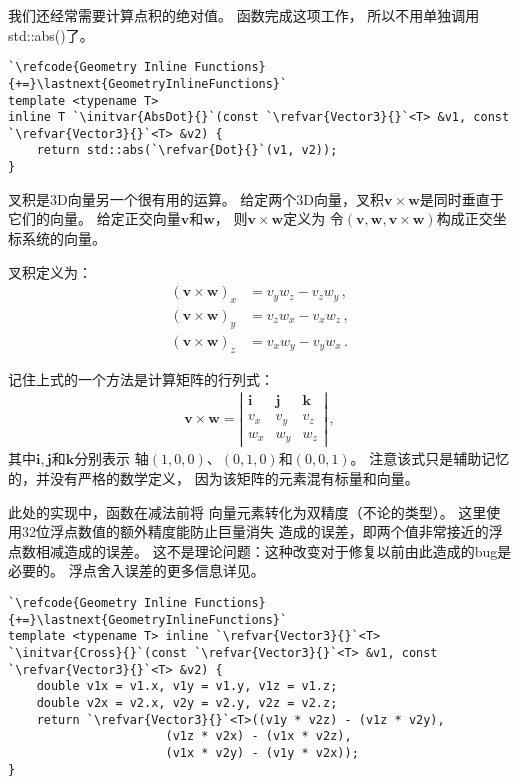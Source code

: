 我们还经常需要计算点积的绝对值。
函数完成这项工作，
所以不用单独调用{\ttfamily std::abs()}了。
\begin{lstlisting}
`\refcode{Geometry Inline Functions}{+=}\lastnext{GeometryInlineFunctions}`
template <typename T>
inline T `\initvar{AbsDot}{}`(const `\refvar{Vector3}{}`<T> &v1, const `\refvar{Vector3}{}`<T> &v2) {
    return std::abs(`\refvar{Dot}{}`(v1, v2));
}
\end{lstlisting}

叉积是3D向量另一个很有用的运算。
给定两个3D向量，叉积$\bm v\times\bm w$是同时垂直于它们的向量。
给定正交向量$\bm v$和$\bm w$，
则$\bm v\times\bm w$定义为
令$(\bm v,\bm w,\bm v\times\bm w)$构成正交坐标系统的向量。

叉积定义为：
\begin{align*}
    (\bm v\times\bm w)_x & = v_y w_z- v_z w_y\, , \\
    (\bm v\times\bm w)_y & = v_z w_x- v_x w_z\, , \\
    (\bm v\times\bm w)_z & = v_x w_y- v_y w_x\, .
\end{align*}

记住上式的一个方法是计算矩阵的行列式：
\begin{align*}
    \bm v\times\bm w=\left|
    \begin{array}{ccc}
        \mathbf{i} & \mathbf{j} & \mathbf{k} \\
        v_x        & v_y        & v_z        \\
        w_x        & w_y        & w_z
    \end{array}\right|\, ,
\end{align*}
其中$\mathbf{i},\mathbf{j}$和$\mathbf{k}$分别表示
轴$(1,0,0)$、$(0,1,0)$和$(0,0,1)$。
注意该式只是辅助记忆的，并没有严格的数学定义，
因为该矩阵的元素混有标量和向量。

此处的实现中，函数在减法前将
向量元素转化为双精度（不论的类型）。
这里使用32位浮点数值的额外精度能防止巨量消失
造成的误差，即两个值非常接近的浮点数相减造成的误差。
这不是理论问题：这种改变对于修复以前由此造成的bug是必要的。
浮点舍入误差的更多信息详见。
\begin{lstlisting}
`\refcode{Geometry Inline Functions}{+=}\lastnext{GeometryInlineFunctions}`
template <typename T> inline `\refvar{Vector3}{}`<T>
`\initvar{Cross}{}`(const `\refvar{Vector3}{}`<T> &v1, const `\refvar{Vector3}{}`<T> &v2) {
    double v1x = v1.x, v1y = v1.y, v1z = v1.z;
    double v2x = v2.x, v2y = v2.y, v2z = v2.z;
    return `\refvar{Vector3}{}`<T>((v1y * v2z) - (v1z * v2y),
                      (v1z * v2x) - (v1x * v2z),
                      (v1x * v2y) - (v1y * v2x));
} 
\end{lstlisting}

